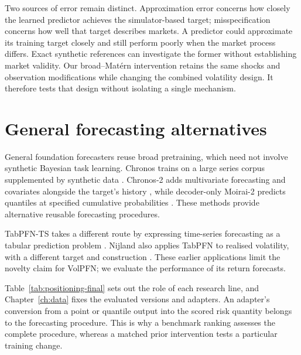 Two sources of error remain distinct. Approximation error concerns how closely the learned predictor achieves the simulator-based target; misspecification concerns how well that target describes markets. A predictor could approximate its training target closely and still perform poorly when the market process differs. Exact synthetic references can investigate the former without establishing market validity. Our broad--Mat\'ern intervention retains the same shocks and observation modifications while changing the combined volatility design. It therefore tests that design without isolating a single mechanism.

\section{General forecasting alternatives}

General foundation forecasters reuse broad pretraining, which need not involve synthetic Bayesian task learning. Chronos trains on a large series corpus supplemented by synthetic data \citep{ansari2024chronos}. Chronos-2 adds multivariate forecasting and covariates alongside the target's history \citep{ansari2025chronos2}, while decoder-only Moirai-2 predicts quantiles at specified cumulative probabilities \citep{liu2025moirai2}. These methods provide alternative reusable forecasting procedures.

TabPFN-TS takes a different route by expressing time-series forecasting as a tabular prediction problem \citep{hoo2025tables}. Nijland also applies TabPFN to realised volatility, with a different target and construction \citep{nijland2026performance}. These earlier applications limit the novelty claim for VolPFN; we evaluate the performance of its return forecasts.

Table~\ref{tab:positioning-final} sets out the role of each research line, and Chapter~\ref{ch:data} fixes the evaluated versions and adapters. An adapter's conversion from a point or quantile output into the scored risk quantity belongs to the forecasting procedure. This is why a benchmark ranking assesses the complete procedure, whereas a matched prior intervention tests a particular training change.

